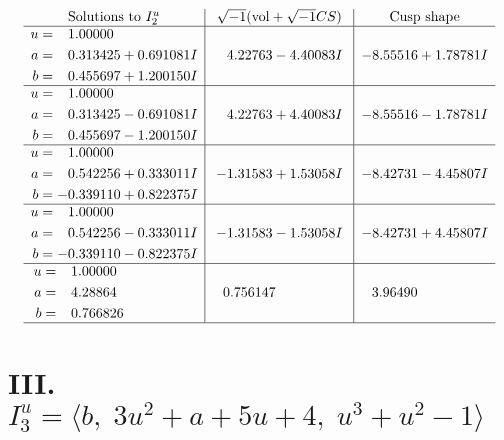 \documentclass[1p]{elsarticle_modified}
\theoremstyle{definition}
\newcommand{\I}{\sqrt{-1}}
\begin{document}
$$\begin{array}{c|c|c}  
\text{Solutions to }I^u_{2}& \I (\text{vol} + \sqrt{-1}CS) & \text{Cusp shape}\\
 \hline 
\begin{aligned}
u &= \phantom{-}1.00000\phantom{ +0.000000I} \\
a &= \phantom{-}0.313425 + 0.691081 I \\
b &= \phantom{-}0.455697 + 1.200150 I\end{aligned}
 & \phantom{-}4.22763 - 4.40083 I & -8.55516 + 1.78781 I \\ \hline\begin{aligned}
u &= \phantom{-}1.00000\phantom{ +0.000000I} \\
a &= \phantom{-}0.313425 - 0.691081 I \\
b &= \phantom{-}0.455697 - 1.200150 I\end{aligned}
 & \phantom{-}4.22763 + 4.40083 I & -8.55516 - 1.78781 I \\ \hline\begin{aligned}
u &= \phantom{-}1.00000\phantom{ +0.000000I} \\
a &= \phantom{-}0.542256 + 0.333011 I \\
b &= -0.339110 + 0.822375 I\end{aligned}
 & -1.31583 + 1.53058 I & -8.42731 - 4.45807 I \\ \hline\begin{aligned}
u &= \phantom{-}1.00000\phantom{ +0.000000I} \\
a &= \phantom{-}0.542256 - 0.333011 I \\
b &= -0.339110 - 0.822375 I\end{aligned}
 & -1.31583 - 1.53058 I & -8.42731 + 4.45807 I \\ \hline\begin{aligned}
u &= \phantom{-}1.00000\phantom{ +0.000000I} \\
a &= \phantom{-}4.28864\phantom{ +0.000000I} \\
b &= \phantom{-}0.766826\phantom{ +0.000000I}\end{aligned}
 & \phantom{-}0.756147\phantom{ +0.000000I} & \phantom{-}3.96490\phantom{ +0.000000I}\\
 \hline 
 \end{array}$$\newpage\newpage\renewcommand{\arraystretch}{1}
\centering \section*{III. $I^u_{3}= \langle b,\;3 u^2+a+5 u+4,\;u^3+u^2-1 \rangle$}
\end{document}
